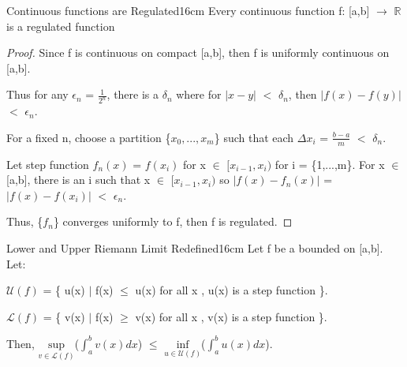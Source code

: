     \newpage



    \begin{wtheorem}{Continuous functions are Regulated}{16cm}
        Every continuous function f: [a,b] $\rightarrow$ $\mathbb{R}$
        is a regulated function
    \end{wtheorem}

    \begin{proof}
        Since f is continuous on compact [a,b], then f is uniformly continuous
        on [a,b].

        Thus for any $\epsilon_n$ = $\frac{1}{2^n}$, there is a $\delta_n$
        where for $|x-y|$ $<$ $\delta_n$, then $|f(x) - f(y)|$ $<$ $\epsilon_n$.

        For a fixed n, choose a partition \{$x_0,...,x_m$\}
        such that each $\Delta x_i$ = $\frac{b-a}{m}$ $<$ $\delta_n$.

        Let step function $f_n(x)$ = $f(x_i)$ for x $\in$ $[x_{i-1},x_i)$
        for i = \{1,...,m\}.
        For x $\in$ [a,b], there is an i such that
        x $\in$ $[x_{i-1},x_i)$ so
        $|f(x) - f_n(x)|$
        = $|f(x) - f(x_i)|$
        $<$ $\epsilon_n$.

        Thus, \{$f_n$\} converges uniformly to f, then f is regulated.
    \end{proof}

    \vspace{0.5cm}



    \begin{wtheorem}{Lower and Upper Riemann Limit Redefined}{16cm}
        Let f be a bounded on [a,b]. Let:

        \hspace{0.5cm}
        $\mathcal{U}(f)$
        = \{ u(x) $|$ f(x) $\leq$ u(x) for all x , u(x) is a step function \}.
        
        \hspace{0.5cm}
        $\mathcal{L}(f)$
        = \{ v(x) $|$ f(x) $\geq$ v(x) for all x , v(x) is a step function \}.
        
        Then,
        $\underset{v \in \mathcal{L}(f)}{\text{sup}}$($\int_a^b v(x) dx$)
        $\leq$ $\underset{u \in \mathcal{U}(f)}{\text{inf}}$($\int_a^b u(x) dx$).
    \end{wtheorem}

